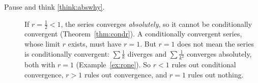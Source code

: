 \documentclass[11pt]{article}
\begin{document}
\begin{description}
  \item[Pause and think \ref{think:abswhy}.] If $r=\frac12<1$, the series converges \emph{absolutely}, so it cannot be conditionally convergent (Theorem~\ref{thm:condr}). A conditionally convergent series, whose limit $r$ exists, must have $r=1$. But $r=1$ does not mean the series is conditionally convergent: $\sum\frac1k$ diverges and $\sum\frac1{k^2}$ converges absolutely, both with $r=1$ (Example~\ref{ex:rone}). So $r<1$ rules out conditional convergence, $r>1$ rules out convergence, and $r=1$ rules out nothing.
\end{description}
\end{document}
